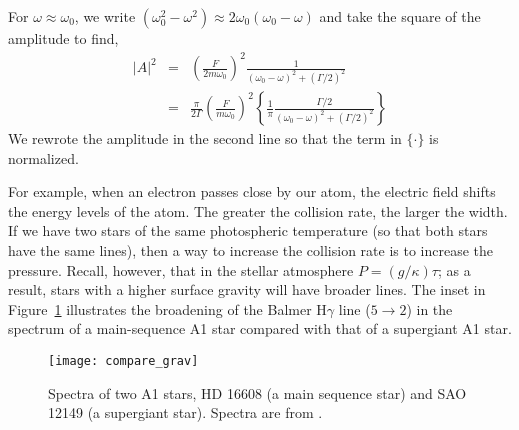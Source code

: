 \begin{sidebar}
For $\omega \approx \omega_0$, we write $(\omega_0^2-\omega^2)\approx 2\omega_0(\omega_0-\omega)$ and take the square of the amplitude to find,
\begin{eqnarray}
    \left|A\right|^2 &=& \left(\frac{F}{2m\omega_0}\right)^2
        \frac{1}{(\omega_0-\omega)^2 + (\Gamma/2)^2}\nonumber\\
    &=& \frac{\pi}{2\Gamma}\left(\frac{F}{m\omega_0}\right)^2
        \left\{\frac{1}{\pi}\frac{\Gamma/2}{(\omega_0-\omega)^2 + (\Gamma/2)^2}\right\}
\end{eqnarray}
We rewrote the amplitude in the second line so that the term in $\{\cdot\}$ is normalized. 
\end{sidebar} 

 For example, when an electron passes close by our atom, the electric field shifts the energy levels of the atom.  The greater the collision rate, the larger the width.
If we have two stars of the same photospheric temperature (so that both stars have the same lines), then a way to increase the collision rate is to increase the pressure. Recall, however, that in the stellar atmosphere $P = (g/\kappa)\tau$; as a result, stars with a higher surface gravity will have broader lines. The inset in Figure~\ref{f.compare_grav} illustrates the broadening of the Balmer H$\gamma$ line ($5\to 2$) in the spectrum of a main-sequence A1 star compared with that of a supergiant A1 star.

\begin{figure}[hp]
    \texttt{[image: compare\_grav]}
    \caption[Spectra of two A1 stars]{\label{f.compare_grav}
    Spectra of two A1 stars, HD 16608 (a main sequence star) and SAO 12149 (a supergiant star).  Spectra are from \citet{Jacoby1984A-library-of-st}.
    }
\end{figure}

